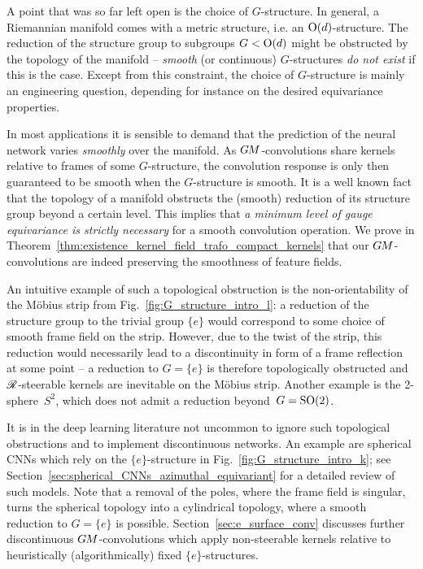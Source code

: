 A point that was so far left open is the choice of $G$-structure.
In general, a Riemannian manifold comes with a metric structure, i.e. an $\operatorname{O}(d)$-structure.
The reduction of the structure group to subgroups $G<\operatorname{O}(d)$ might be obstructed by the topology of the manifold
-- \emph{smooth} (or continuous) $G$-structures \emph{do not exist} if this is the case.
Except from this constraint, the choice of $G$-structure is mainly an engineering question, depending for instance on the desired equivariance properties.


In most applications
it is sensible to demand that the prediction of the neural network varies \emph{smoothly} over the manifold.
As $G\mkern-1.4muM$-convolutions share kernels relative to frames of some $G$-structure, the convolution response is only then guaranteed to be smooth when the $G$-structure is smooth.
It is a well known fact that the topology of a manifold obstructs the (smooth) reduction of its structure group beyond a certain level.
This implies that \emph{a minimum level of gauge equivariance is strictly necessary} for a smooth convolution operation.
We prove in Theorem~\ref{thm:existence_kernel_field_trafo_compact_kernels} that our $G\mkern-1.4muM$-convolutions are indeed preserving the smoothness of feature fields.


An intuitive example of such a topological obstruction is the non-orientability of the M\"obius strip from Fig.~\ref{fig:G_structure_intro_l}:
a reduction of the structure group to the trivial group $\{e\}$ would correspond to some choice of smooth frame field on the strip.
However, due to the twist of the strip, this reduction would necessarily lead to a discontinuity in form of a frame reflection at some point
-- a reduction to $G=\{e\}$ is therefore topologically obstructed and $\mathscr{R}$-steerable kernels are inevitable on the M\"obius strip.
Another example is the 2-sphere~$S^2$, which does not admit a reduction beyond~$G=\operatorname{SO}(2)$.


It is in the deep learning literature not uncommon
to ignore such topological obstructions and to implement discontinuous networks.
An example are spherical CNNs which rely on the $\{e\}$-structure in Fig.~\ref{fig:G_structure_intro_k}; see Section~\ref{sec:spherical_CNNs_azimuthal_equivariant} for a detailed review of such models.
Note that a removal of the poles, where the frame field is singular, turns the spherical topology into a cylindrical topology, where a smooth reduction to $G=\{e\}$ is possible.
Section~\ref{sec:e_surface_conv} discusses further discontinuous $G\mkern-1.4muM$-convolutions which apply non-steerable kernels relative to heuristically (algorithmically) fixed $\{e\}$-structures.


